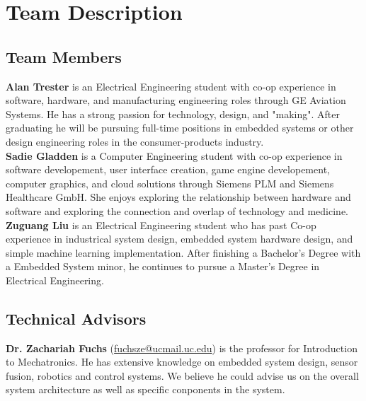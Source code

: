 \chapter{Team Description}

\section{Team Members}
	
	\textbf{Alan Trester} is an Electrical Engineering student with co-op experience in software, hardware, and manufacturing engineering roles through GE Aviation Systems. He has a strong passion for technology, design, and "making". After graduating he will be pursuing full-time positions in embedded systems or other design engineering roles in the consumer-products industry.\\
	
	\textbf{Sadie Gladden } is a Computer Engineering student with co-op experience in software developement, user interface creation, game engine developement, computer graphics, and cloud solutions through Siemens PLM and Siemens Healthcare GmbH. She enjoys exploring the relationship between hardware and software and exploring the connection and overlap of technology and medicine.\\
	
	\textbf{Zuguang Liu} is an Electrical Engineering student who has past Co-op experience in industrical system design, embedded system hardware design, and simple machine learning implementation. After finishing a Bachelor's Degree with a Embedded System minor, he continues to pursue a Master's Degree in Electrical Engineering. 
	
\section{Technical Advisors} 
	
	\textbf{Dr. Zachariah Fuchs} (\href{fuchsze@ucmail.uc.edu}{fuchsze@ucmail.uc.edu}) is the professor for Introduction to Mechatronics. He has extensive knowledge on embedded system design, sensor fusion, robotics and control systems. We believe he could advise us on the overall system architecture as well as specific conponents in the system. \\
	

	